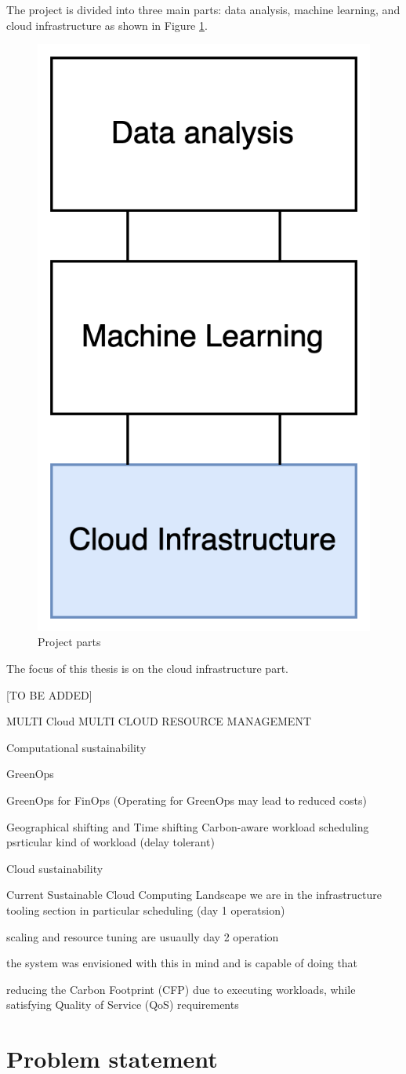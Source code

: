 The project is divided into three main parts: data analysis, machine learning, and cloud infrastructure as shown in Figure \ref{fig:project_parts}.

\begin{figure}[htb]
    \centering
    \includegraphics[width=0.25\linewidth]{images/project_parts.png}
    \caption{Project parts}
    \label{fig:project_parts}
\end{figure}

The focus of this thesis is on the cloud infrastructure part.


[TO BE ADDED]

MULTI Cloud
MULTI CLOUD RESOURCE MANAGEMENT


Computational sustainability

GreenOps

GreenOps for FinOps
(Operating for GreenOps may lead to reduced costs)

Geographical shifting and Time shifting
Carbon-aware workload scheduling
psrticular kind of workload (delay tolerant)


Cloud sustainability

Current Sustainable Cloud Computing Landscape
we are in the infrastructure tooling section
in particular scheduling (day 1 operatsion)

scaling and resource tuning are usuaully day 2 operation

the system was envisioned with this in mind and is capable of doing that



reducing the Carbon Footprint (CFP) due to
executing workloads, 
while satisfying Quality of Service (QoS)
requirements

\section{Problem statement}
\label{sec:problem}

